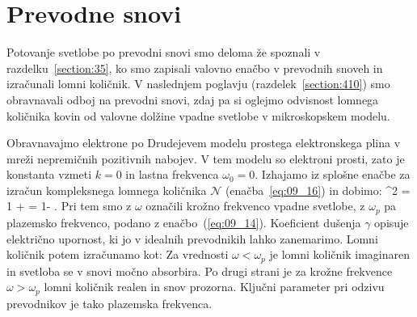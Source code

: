 \section{Prevodne snovi}
Potovanje svetlobe po prevodni snovi smo deloma že spoznali v 
razdelku~\ref{section:35}, ko smo zapisali valovno enačbo 
v prevodnih snoveh in izračunali lomni količnik.
V naslednjem poglavju (razdelek~\ref{section:410}) 
smo obravnavali odboj na prevodni snovi, zdaj pa si oglejmo odvisnost
lomnega količnika kovin od valovne dolžine vpadne svetlobe v mikroskopskem
modelu.

Obravnavajmo elektrone po Drudejevem modelu prostega elektronskega plina
v mreži nepremičnih pozitivnih nabojev. V tem modelu so elektroni prosti,
zato je konstanta vzmeti $k=0$ in lastna frekvenca $\omega_0=0$. Izhajamo 
iz splošne enačbe za izračun kompleksnega lomnega količnika $\mathcal{N}$
(enačba~\ref{eq:09_16}) in dobimo:
\beq
{}^2 = 1 +  = 1- 
.
\label{eq:09_36}
\eeq
Pri tem smo z $\omega$ označili krožno frekvenco vpadne svetlobe, z
$\omega_p$ pa plazemsko frekvenco, podano z enačbo~(\ref{eq:09_14}). 
Koeficient dušenja $\gamma$ opisuje električno upornost, ki jo v idealnih 
prevodnikih lahko zanemarimo. Lomni količnik potem izračunamo kot:
Za vrednosti $\omega < \omega_p$ je lomni količnik imaginaren in svetloba se v snovi
močno absorbira. Po drugi strani je za krožne frekvence $\omega > \omega_p$ lomni količnik realen 
in snov prozorna. Ključni parameter pri odzivu prevodnikov je tako plazemska frekvenca. 

